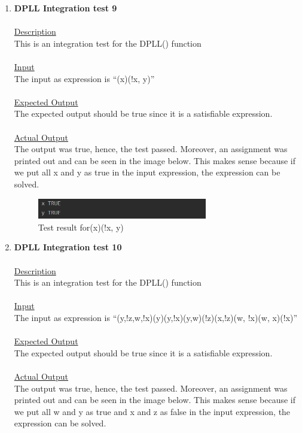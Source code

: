 \documentclass{article}
\newcommand{\quotes}[1]{``#1''}
\begin{document}
\begin{enumerate}
															\item \textbf{DPLL Integration test 9}\\\\
		\underline{Description}\\
		\indent This is an integration test for the DPLL() function\\\\
		\underline{Input}\\
		\indent The input as expression is \quotes{(x)(!x, y)}\\	\\
		\underline{Expected Output}\\
		\indent The expected output should be true since it is a satisfiable expression.\\\\
		\underline{Actual Output}\\
		The output was true, hence, the test passed. Moreover, an assignment was printed out and can be seen in the image below. This makes sense because if we put all x and y as true in the input expression, the expression can be solved. 

				\begin{figure}[H]
					\centering
			 			\includegraphics[width=0.7\textwidth]{dplltest9.png}
			 			\centering
			  			\caption{Test result for(x)(!x, y)}
			  			\label{fig:dplltest9}
					\end{figure}		
					
							\item \textbf{DPLL Integration test 10}\\\\
		\underline{Description}\\
		\indent This is an integration test for the DPLL() function\\\\
		\underline{Input}\\
		\indent The input as expression is \quotes{(y,!z,w,!x)(y)(y,!x)(y,w)(!z)(x,!z)(w, !x)(w, x)(!x)}\\	\\
		\underline{Expected Output}\\
		\indent The expected output should be true since it is a satisfiable expression.\\\\
		\underline{Actual Output}\\
		The output was true, hence, the test passed. Moreover, an assignment was printed out and can be seen in the image below. This makes sense because if we put all w and y as true and x and z as false in the input expression, the expression can be solved. 


\end{enumerate}
\end{document}
